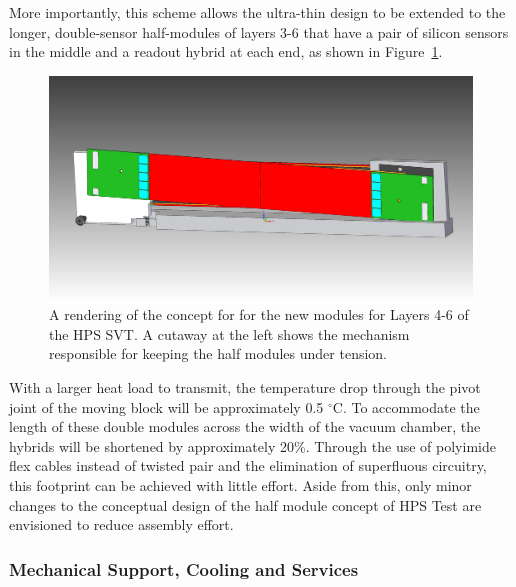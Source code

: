 More importantly, this scheme allows the ultra-thin design to be extended to the longer, double-sensor half-modules of layers 3-6 that have a pair of silicon sensors in the middle and a readout hybrid at each end, as shown in Figure~\ref{fig:newmodule_L4-6}.  
\begin{figure}[ht]
    \includegraphics[width=\textwidth]{svt/figures/10dec1}
\caption{\small{A rendering of the concept for for the new modules for Layers 4-6 of the HPS SVT.  A cutaway at the left shows the mechanism responsible for keeping the half modules under tension.} }
\label{fig:newmodule_L4-6}
\end{figure}
With a larger heat load to transmit, the temperature drop through the pivot joint of the moving block will be approximately 0.5 $^\circ$C. To accommodate the length of these double modules across the width of the vacuum chamber, the hybrids will be shortened by approximately 20\%.  Through the use of polyimide flex cables instead of twisted pair and the elimination of superfluous circuitry, this footprint can be achieved with little effort.  Aside from this, only minor changes to the conceptual design of the half module concept of HPS Test are envisioned to reduce assembly effort.

\subsubsection{Mechanical Support, Cooling and Services}

